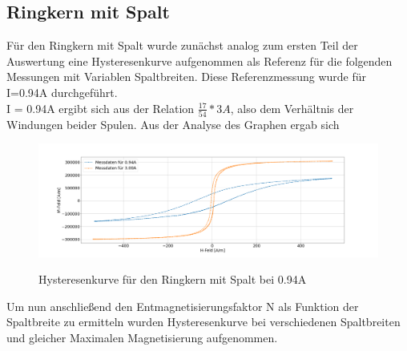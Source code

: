     \subsection{Ringkern mit Spalt}
        Für den Ringkern mit Spalt wurde zunächst analog zum ersten Teil der Auswertung eine Hysteresenkurve aufgenommen als Referenz für die folgenden Messungen mit Variablen Spaltbreiten.
        Diese Referenzmessung wurde für I=0.94A durchgeführt.\\
        I = 0.94A ergibt sich aus der Relation $\frac{17}{54} * 3A$, also dem Verhältnis der Windungen beider Spulen.
        Aus der Analyse des Graphen ergab sich
        \begin{figure}[H]
            \centering
            \includegraphics[width=\textwidth]{Images/Teil4.1.png}
            \label{Hyst4}
            \caption{Hysteresenkurve für den Ringkern mit Spalt bei 0.94A}
        \end{figure}
        Um nun anschließend den Entmagnetisierungsfaktor N als Funktion der Spaltbreite zu ermitteln wurden Hysteresenkurve bei verschiedenen Spaltbreiten und gleicher Maximalen Magnetisierung
        aufgenommen.
